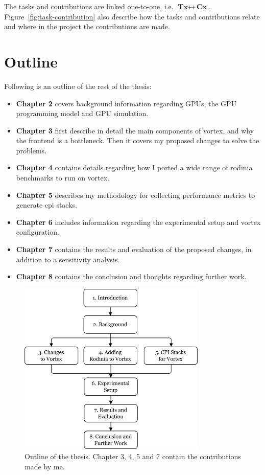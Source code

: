 The tasks and contributions are linked one-to-one, i.e. $\textbf{Tx}\leftrightarrow~\textbf{Cx}$. Figure~\ref{fig:task-contribution} also describe how the tasks and contributions relate and where in the project the contributions are made.

\section{Outline}

Following is an outline of the rest of the thesis:

\begin{itemize}
    \item \textbf{Chapter 2} covers background information regarding GPUs, the GPU programming model and GPU simulation.
    \item \textbf{Chapter 3} first describe in detail the main components of \Gls{vortex}, and why the frontend is a bottleneck. Then it covers my proposed changes to solve the problems.
    \item \textbf{Chapter 4} contains details regarding how I ported a wide range of \Gls{rodinia} benchmarks to run on \Gls{vortex}.
    \item \textbf{Chapter 5} describes my methodology for collecting performance metrics to generate \acrshort{cpi} stacks.
    \item \textbf{Chapter 6} includes information regarding the experimental setup and \Gls{vortex} configuration.
    \item \textbf{Chapter 7} contains the results and evaluation of the proposed changes, in addition to a sensitivity analysis.
    \item \textbf{Chapter 8} contains the conclusion and thoughts regarding further work.
\end{itemize}

\begin{figure}
    \centering
    \includegraphics[width=0.8\textwidth]{figures/thesis-outline.png}
    \caption[Thesis outline]{Outline of the thesis. Chapter 3, 4, 5 and 7 contain the contributions made by me.}
    \label{fig:thesis_outline}
\end{figure}